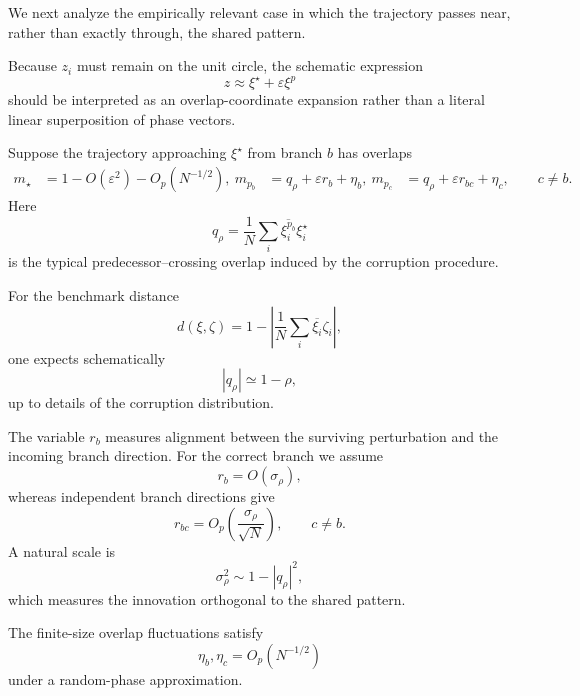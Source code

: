 We next analyze the empirically relevant case in which the trajectory passes
near, rather than exactly through, the shared pattern.

Because $z_i$ must remain on the unit circle, the schematic expression
\begin{equation}
z
\approx
\xi^\star+\varepsilon\xi^{p}
\end{equation}
should be interpreted as an overlap-coordinate expansion rather than a literal
linear superposition of phase vectors.

Suppose the trajectory approaching $\xi^\star$ from branch $b$ has overlaps
\begin{align}
m_\star
&=
1-O(\varepsilon^2)-O_p(N^{-1/2}),
\label{eq:m-star-local}
\
m_{p_b}
&=
q_\rho+\varepsilon r_b+\eta_b,
\label{eq:m-prev-local}
\
m_{p_c}
&=
q_\rho+\varepsilon r_{bc}+\eta_c,
\qquad c\neq b.
\label{eq:m-wrong-prev-local}
\end{align}
Here
\begin{equation}
q_\rho
=
\frac{1}{N}
\sum_i
\overline{\xi_i^{p_b}}\xi_i^\star
\end{equation}
is the typical predecessor–crossing overlap induced by the corruption
procedure.

For the benchmark distance
\begin{equation}
d(\xi,\zeta)
=
1-
\left|
\frac{1}{N}
\sum_i
\overline{\xi_i}\zeta_i
\right|,
\end{equation}
one expects schematically
\begin{equation}
|q_\rho|
\simeq
1-\rho,
\end{equation}
up to details of the corruption distribution.

The variable $r_b$ measures alignment between the surviving perturbation and
the incoming branch direction.  For the correct branch we assume
\begin{equation}
r_b=O(\sigma_\rho),
\end{equation}
whereas independent branch directions give
\begin{equation}
r_{bc}
=
O_p\left(\frac{\sigma_\rho}{\sqrt N}\right),
\qquad c\neq b.
\end{equation}
A natural scale is
\begin{equation}
\sigma_\rho^2
\sim
1-|q_\rho|^2,
\end{equation}
which measures the innovation orthogonal to the shared pattern.

The finite-size overlap fluctuations satisfy
\begin{equation}
\eta_b,\eta_c
=
O_p(N^{-1/2})
\end{equation}
under a random-phase approximation.

